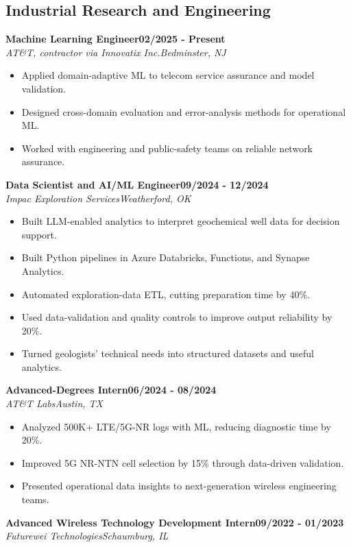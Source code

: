 \documentclass[9pt,letterpaper]{extarticle}
\newcommand{\role}[4]{%
  \Needspace{4\baselineskip}\textbf{#1}\hfill\textbf{#2}\\[-1pt]
  \textit{#3}\hfill\textit{#4}\par}
\begin{document}
\subsection{Industrial Research and Engineering}
\role{Machine Learning Engineer}{02/2025 - Present}{AT\&T, contractor via Innovatix Inc.}{Bedminster, NJ}
\begin{itemize}
\item Applied domain-adaptive ML to telecom service assurance and model validation.
\item Designed cross-domain evaluation and error-analysis methods for operational ML.
\item Worked with engineering and public-safety teams on reliable network assurance.
\end{itemize}
\vspace{1pt}
\role{Data Scientist and AI/ML Engineer}{09/2024 - 12/2024}{Impac Exploration Services}{Weatherford, OK}
\begin{itemize}
\item Built LLM-enabled analytics to interpret geochemical well data for decision support.
\item Built Python pipelines in Azure Databricks, Functions, and Synapse Analytics.
\item Automated exploration-data ETL, cutting preparation time by 40\%.
\item Used data-validation and quality controls to improve output reliability by 20\%.
\item Turned geologists' technical needs into structured datasets and useful analytics.
\end{itemize}
\vspace{1pt}
\role{Advanced-Degrees Intern}{06/2024 - 08/2024}{AT\&T Labs}{Austin, TX}
\begin{itemize}
\item Analyzed 500K+ LTE/5G-NR logs with ML, reducing diagnostic time by 20\%.
\item Improved 5G NR-NTN cell selection by 15\% through data-driven validation.
\item Presented operational data insights to next-generation wireless engineering teams.
\end{itemize}
\vspace{1pt}
\role{Advanced Wireless Technology Development Intern}{09/2022 - 01/2023}{Futurewei Technologies}{Schaumburg, IL}
\end{document}
